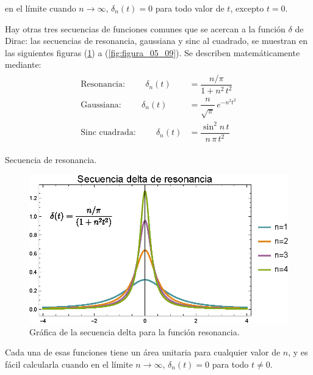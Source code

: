 \documentclass[12pt]{article}
\numberwithin{equation}{section}
\begin{document}
en el límite cuando $n \to \infty$, $\delta_{n}(t) = 0$ para todo valor de $t$, excepto $t = 0$. 
\par
Hay otras tres secuencias de funciones comunes que se acercan a la función $\delta$ de Dirac: las secuencias de resonancia, gaussiana y sinc al cuadrado, se muestran en las siguientes figuras (\ref{fig:figura_05_07}) a (\ref{fig:figura_05_09}). Se describen matemáticamente mediante:
\begin{align}
\begin{aligned}
\mbox{Resonancia:} \hspace{1cm} \delta_{n}(t) &= \dfrac{n/\pi}{1 + n^{2} \, t^{2}} \\[1em]
\mbox{Gaussiana:} \hspace{1cm} \delta_{n}(t) &= \dfrac{n}{\sqrt{\pi}} \, e^{-n^{2} t^{2}} \\[1em]
\mbox{Sinc cuadrada:} \hspace{1cm} \delta_{n}(t) &= \dfrac{\sin^{2} n \, t}{n \, \pi \, t^{2}} 
\end{aligned}
\label{eq:ecuacion_05_13}
\end{align}

\newpage

Secuencia de resonancia.
\begin{figure}[H]
    \centering
    \includegraphics[scale=1]{Imagenes/secuencia_Delta_05.eps}
    \caption{Gráfica de la secuencia delta para la función resonancia.}
    \label{fig:figura_05_07}
\end{figure}
Cada una de esas funciones tiene un área unitaria para cualquier valor de $n$, y es fácil calcularla cuando en el límite $n \to \infty$, $\delta_{n} (t) = 0$ para todo $t \neq 0$.
\end{document}
